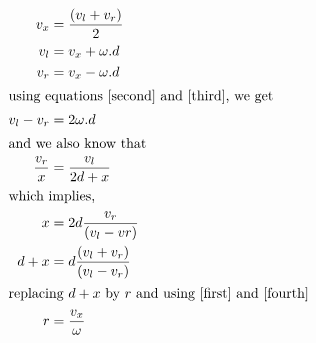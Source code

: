\documentclass[a4paper,12pt]{article}
\begin{document}
 
\begin{align}
\label{first}
v_{x}&=\frac{(v_{l}+v_{r})}{2}\\
\label{second}
v_{l}&=v_{x}+\omega.d\\
\label{third}
v_{r}&=v_{x}-\omega.d\\
\intertext{using equations \ref{second} and \ref{third}, we get}
\label{fourth}
v_{l}-v_{r}&=2\omega.d\\  
\intertext{and we also know that}
\frac{v_{r}}{x}&=\frac{v_{l}}{2d+x}\\
\intertext{which implies,} 
x&=2d\frac{v_{r}}{(v_{l}-v{r})}\\
d+x&=d\frac{(v_{l}+v_{r})}{(v_{l}-v_{r})}\\
\intertext{replacing $d+x$ by $r$ and using \ref{first} and \ref{fourth}}
r&=\frac{v_{x}}{\omega}
\end{align}
\end{document}
